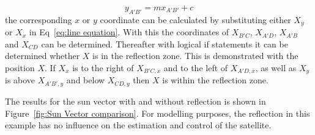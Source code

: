 \documentclass[letterpaper, 10 pt, conference]{ieeeconf}  %
\begin{document}
\begin{equation}
y_{A'B'} = mx_{A'B'} + c
\label{eq:line equation}
\end{equation}
the corresponding $x$ or $y$ coordinate can be calculated by substituting either $X_y$ or $X_x$ in Eq~\ref{eq:line equation}. With this the coordinates of $X_{B'C}$, $X_{A'D}$, $X_{A'B}$ and $X_{CD}$ can be determined. Thereafter with logical if statements it can be determined whether $X$ is in the reflection zone. This is demonstrated with the position $X$. If $X_x$ is to the right of $X_{B'C,x}$ and to the left of $X_{A'D,x}$, as well as $X_y$ is above $X_{A'B',y}$ and below $X_{CD,y}$ then $X$ is within the reflection zone. 

The results for the sun vector with and without reflection is shown in Figure~\ref{fig:Sun Vector comparison}. For modelling purposes, the reflection in this example has no influence on the estimation and control of the satellite.
\end{document}
